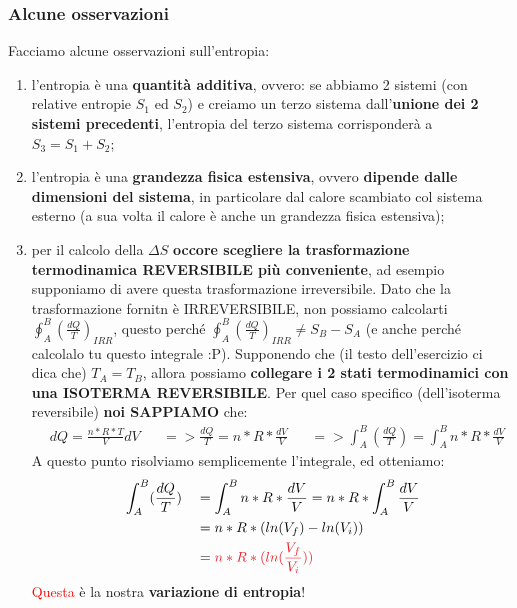             \subsubsection{Alcune osservazioni}
                Facciamo alcune osservazioni sull'entropia:
                \begin{enumerate}
                    \item l'entropia è una \textbf{quantità additiva}, ovvero: se abbiamo 2 sistemi (con relative entropie $S_1$ ed $S_2$) e creiamo un terzo sistema dall'\textbf{unione dei 2 sistemi precedenti}, l'entropia del terzo sistema corrisponderà a $S_3 = S_1 + S_2$;
                    \item l'entropia è una \textbf{grandezza fisica estensiva}, ovvero \textbf{dipende dalle dimensioni del sistema}, in particolare dal calore scambiato col sistema esterno (a sua volta il calore è anche un grandezza fisica estensiva);
                    \item per il calcolo della $\Delta S$ \textbf{occore scegliere la trasformazione termodinamica REVERSIBILE più conveniente}, ad esempio supponiamo di avere questa trasformazione irreversibile.
                    Dato che la trasformazione fornitn è IRREVERSIBILE, non possiamo calcolarti $\oint_{A}^B(\frac{dQ}{T})_{IRR}$, questo perché $\oint_{A}^B(\frac{dQ}{T})_{IRR}\neq S_B-S_A$ (e anche perché calcolalo tu questo integrale :P). Supponendo che (il testo dell'esercizio ci dica che) $T_A = T_B$, allora possiamo \textbf{collegare i 2 stati termodinamici con una ISOTERMA REVERSIBILE}. Per quel caso specifico (dell'isoterma reversibile) \textbf{noi SAPPIAMO} che:
                    \begin{align*}
                        &dQ = \frac{n*R*T}{V}dV&&=>\frac{dQ}{T}=n*R*\frac{dV}{V}&&=> \int_A^B(\frac{dQ}{T}) = \int_A^Bn*R*\frac{dV}{V}
                    \end{align*}
                    A questo punto risolviamo semplicemente l'integrale, ed otteniamo:
                    \begin{align*}
                        &\int_A^B(\frac{dQ}{T}) &&= \int_A^Bn*R*\frac{dV}{V}=n*R*\int_A^B\frac{dV}{V}\\
                         & && = n*R*(ln(V_f)-ln(V_i))\\
                         & && = \textcolor{Red}{n*R*(ln(\frac{V_f}{V_i}))}\\
                    \end{align*}
                    \textcolor{Red}{Questa} è la nostra \textbf{variazione di entropia}!
                \end{enumerate}

